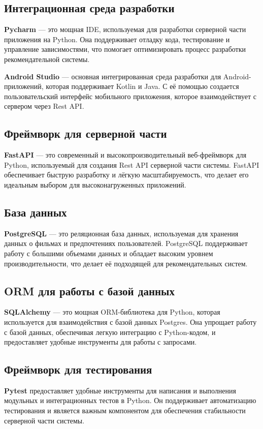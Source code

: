 \subsection{Интеграционная среда разработки}
\textbf{Pycharm} — это мощная IDE, используемая для разработки серверной части приложения на Python. Она поддерживает отладку кода, тестирование и управление зависимостями, что помогает оптимизировать процесс разработки рекомендательной системы.

\textbf{Android Studio} — основная интегрированная среда разработки для Android-приложений, которая поддерживает Kotlin и Java. С её помощью создается пользовательский интерфейс мобильного приложения, которое взаимодействует с сервером через Rest API.

\subsection{Фреймворк для серверной части}
\textbf{FastAPI} — это современный и высокопроизводительный веб-фреймворк для Python, используемый для создания Rest API серверной части системы. FastAPI обеспечивает быструю разработку и лёгкую масштабируемость, что делает его идеальным выбором для высоконагруженных приложений.

\subsection{База данных}
\textbf{PostgreSQL} — это реляционная база данных, используемая для хранения данных о фильмах и предпочтениях пользователей. PostgreSQL поддерживает работу с большими объемами данных и обладает высоким уровнем производительности, что делает её подходящей для рекомендательных систем.

\subsection{ORM для работы с базой данных}
\textbf{SQLAlchemy} — это мощная ORM-библиотека для Python, которая используется для взаимодействия с базой данных Postgres. Она упрощает работу с базой данных, обеспечивая легкую интеграцию с Python-кодом, и предоставляет удобные инструменты для работы с запросами.

\subsection{Фреймворк для тестирования}
\textbf{Pytest} предоставляет удобные инструменты для написания и выполнения модульных и интеграционных тестов в Python. Он поддерживает автоматизацию тестирования и является важным компонентом для обеспечения стабильности серверной части системы.

